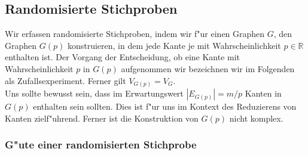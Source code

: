 \subsection{Randomisierte Stichproben}

Wir erfassen randomisierte Stichproben, indem wir f"ur einen Graphen $G$, den
    Graphen $G(p)$ konstruieren, in dem jede Kante je mit Wahrscheinlichkeit 
    $p \in \mathbb{R}$ enthalten ist. 
    Der Vorgang der Entscheidung, ob eine Kante mit Wahrscheinlichkeit $p$
    in $G(p)$ aufgenommen wir bezeichnen wir im Folgenden als Zufallsexperiment.
    Ferner gilt $V_{G(p)} = V_G$.\\
Uns sollte bewusst sein, dass im Erwartungswert $|E_{G(p)}| = m / p$ Kanten
    in $G(p)$ enthalten sein sollten.
    Dies ist f"ur uns im Kontext des Reduzierens von Kanten zielf"uhrend.
    Ferner ist die Konstruktion von $G(p)$ nicht komplex.\\

\subsubsection{G"ute einer randomisierten Stichprobe}

